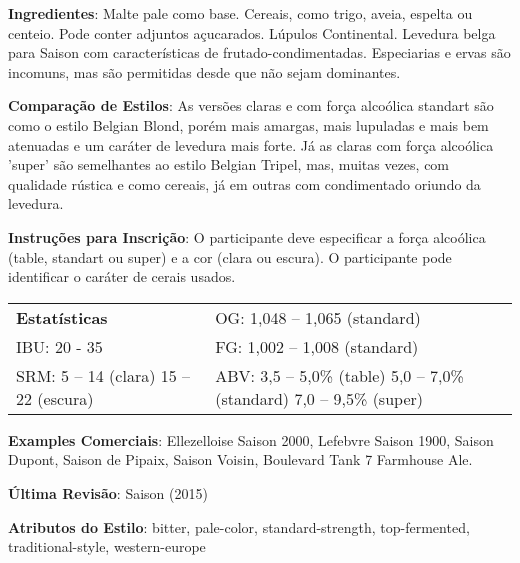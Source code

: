 \textbf{Ingredientes}: Malte pale como base. Cereais, como trigo, aveia, espelta ou centeio. Pode conter adjuntos açucarados. Lúpulos Continental. Levedura belga para Saison com características de frutado-condimentadas. Especiarias e ervas são incomuns, mas são permitidas desde que não sejam dominantes.

\textbf{Comparação de Estilos}: As versões claras e com força alcoólica standart são como o estilo Belgian Blond, porém mais amargas, mais lupuladas e mais bem atenuadas e um caráter de levedura mais forte. Já as claras com força alcoólica 'super' são semelhantes ao estilo Belgian Tripel, mas, muitas vezes, com qualidade rústica e como cereais, já em outras com condimentado oriundo da levedura.

\textbf{Instruções para Inscrição}: O participante deve especificar a força alcoólica (table, standart ou super) e a cor (clara ou escura). O participante pode identificar o caráter de cerais usados.

\begin{tabular}{@{}p{35mm}p{35mm}@{}}
  \textbf{Estatísticas} & OG: 1,048 – 1,065 (standard)  \\
  IBU: 20 - 35  & FG: 1,002 – 1,008 (standard)   \\
  SRM: 5 – 14 (clara) 15 – 22 (escura) & ABV: 3,5 – 5,0\% (table) 5,0 – 7,0\% (standard) 7,0 – 9,5\% (super)
\end{tabular}

\textbf{Examples Comerciais}: Ellezelloise Saison 2000, Lefebvre Saison 1900, Saison Dupont, Saison de Pipaix, Saison Voisin, Boulevard Tank 7 Farmhouse Ale.

\textbf{Última Revisão}: Saison (2015)

\textbf{Atributos do Estilo}: bitter, pale-color, standard-strength, top-fermented, traditional-style, western-europe

